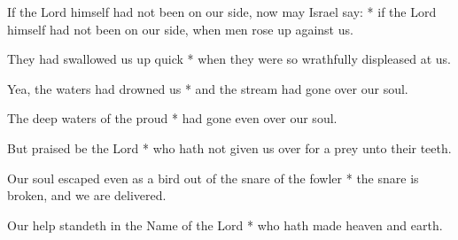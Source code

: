 \begin{multicols}{2}
	
	If the Lord himself had not been on our side, now may Israel say: * if the Lord himself had not been on our side, when men rose up against us.
	
	They had swallowed us up quick * when they were so wrathfully displeased at us.
	
	Yea, the waters had drowned us * and the stream had gone over our soul.
	
	The deep waters of the proud * had gone even over our soul.
	
	But praised be the Lord * who hath not given us over for a prey unto their teeth.
	
	Our soul escaped even as a bird out of the snare of the fowler * the snare is broken, and we are delivered.
	
	Our help standeth in the Name of the Lord * who hath made heaven and earth.
	
	\gloria{}
\end{multicols}